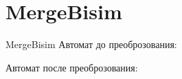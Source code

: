 \section{MergeBisim}
\begin{frame}{MergeBisim}
	Автомат до преоброзования:


	Автомат после преоброзования:

\end{frame}
